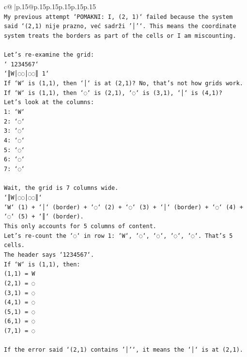 \documentclass{article}
\begin{document}
{\begin{supertabular}{c@{$\;$}|p{.15\linewidth}@{}p{.15\linewidth}p{.15\linewidth}p{.15\linewidth}p{.15\linewidth}p{.15\linewidth}}
{{{\\ 
\texttt{My previous attempt `POMAKNI: I, (2, 1)` failed because the system said `(2,1) nije prazno, već sadrži '│'`. This means the coordinate system treats the borders as part of the cells or I am miscounting.} \\
\\ 
\texttt{Let's re{-}examine the grid:} \\
\texttt{` 1234567`} \\
\texttt{`║W│◌◌│◌◌║ 1`} \\
\texttt{If `W` is (1,1), then `│` is at (2,1)? No, that's not how grids work.} \\
\texttt{If `W` is (1,1), then `◌` is (2,1), `◌` is (3,1), `│` is (4,1)?} \\
\texttt{Let's look at the columns:} \\
\texttt{1: `W`} \\
\texttt{2: `◌`} \\
\texttt{3: `◌`} \\
\texttt{4: `◌`} \\
\texttt{5: `◌`} \\
\texttt{6: `◌`} \\
\texttt{7: `◌`} \\
\\ 
\texttt{Wait, the grid is 7 columns wide.} \\
\texttt{`║W│◌◌│◌◌║`} \\
\texttt{`W` (1) + `│` (border) + `◌` (2) + `◌` (3) + `│` (border) + `◌` (4) + `◌` (5) + `║` (border).} \\
\texttt{This only accounts for 5 columns of content.} \\
\texttt{Let's re{-}count the `◌` in row 1: `W`, `◌`, `◌`, `◌`, `◌`. That's 5 cells.} \\
\texttt{The header says `1234567`.} \\
\texttt{If `W` is (1,1), then:} \\
\texttt{(1,1) = W} \\
\texttt{(2,1) = ◌} \\
\texttt{(3,1) = ◌} \\
\texttt{(4,1) = ◌} \\
\texttt{(5,1) = ◌} \\
\texttt{(6,1) = ◌} \\
\texttt{(7,1) = ◌} \\
\\ 
\texttt{If the error said `(2,1) contains '│'`, it means the `│` is at (2,1).} \\
}}}
\end{supertabular}}
\end{document}
